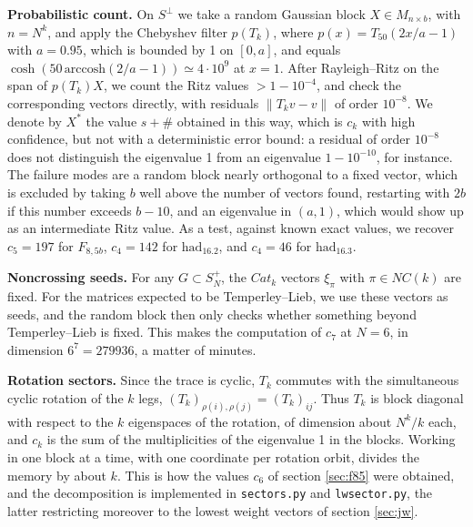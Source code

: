 \documentclass[11pt]{amsart}
\begin{document}
\noindent\textbf{Probabilistic count.} On $S^\perp$ we take a random Gaussian block $X\in M_{n\times b}$, with $n=N^k$, and apply the Chebyshev filter $p(T_k)$, where $p(x)=T_{50}(2x/a-1)$ with $a=0.95$, which is bounded by 1 on $[0,a]$, and equals $\cosh(50\,\mathrm{arccosh}(2/a-1))\simeq4\cdot10^{9}$ at $x=1$. After Rayleigh--Ritz on the span of $p(T_k)X$, we count the Ritz values $>1-10^{-4}$, and check the corresponding vectors directly, with residuals $\|T_kv-v\|$ of order $10^{-8}$. We denote by $X^*$ the value $s+\#$ obtained in this way, which is $c_k$ with high confidence, but not with a deterministic error bound: a residual of order $10^{-8}$ does not distinguish the eigenvalue 1 from an eigenvalue $1-10^{-10}$, for instance. The failure modes are a random block nearly orthogonal to a fixed vector, which is excluded by taking $b$ well above the number of vectors found, restarting with $2b$ if this number exceeds $b-10$, and an eigenvalue in $(a,1)$, which would show up as an intermediate Ritz value. As a test, against known exact values, we recover $c_5=197$ for $F_{8,5b}$, $c_4=142$ for $\mathrm{had}_{16.2}$, and $c_4=46$ for $\mathrm{had}_{16.3}$.

\medskip

\noindent\textbf{Noncrossing seeds.} For any $G\subset S_N^+$, the $Cat_k$ vectors $\xi_\pi$ with $\pi\in NC(k)$ are fixed. For the matrices expected to be Temperley--Lieb, we use these vectors as seeds, and the random block then only checks whether something beyond Temperley--Lieb is fixed. This makes the computation of $c_7$ at $N=6$, in dimension $6^7=279936$, a matter of minutes.

\medskip

\noindent\textbf{Rotation sectors.} Since the trace is cyclic, $T_k$ commutes with the simultaneous cyclic rotation of the $k$ legs, $(T_k)_{\rho(i),\rho(j)}=(T_k)_{ij}$. Thus $T_k$ is block diagonal with respect to the $k$ eigenspaces of the rotation, of dimension about $N^k/k$ each, and $c_k$ is the sum of the multiplicities of the eigenvalue 1 in the blocks. Working in one block at a time, with one coordinate per rotation orbit, divides the memory by about $k$. This is how the values $c_6$ of section \ref{sec:f85} were obtained, and the decomposition is implemented in \texttt{sectors.py} and \texttt{lwsector.py}, the latter restricting moreover to the lowest weight vectors of section \ref{sec:jw}.

\medskip
\end{document}
